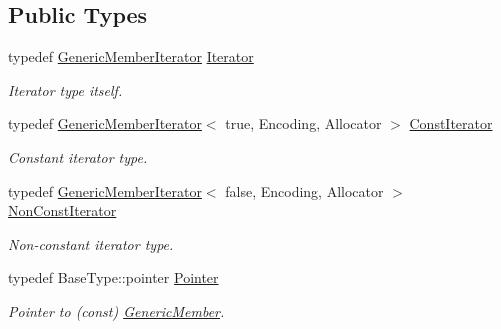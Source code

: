 \subsection*{Public Types}
\begin{DoxyCompactItemize}
\item 
\mbox{\label{class_generic_member_iterator_ad1cf1ecf6210b47906c9f179c893a8b8}} 
typedef \hyperlink{class_generic_member_iterator}{Generic\+Member\+Iterator} \hyperlink{class_generic_member_iterator_ad1cf1ecf6210b47906c9f179c893a8b8}{Iterator}
\begin{DoxyCompactList}\small\item\em Iterator type itself. \end{DoxyCompactList}\item 
\mbox{\label{class_generic_member_iterator_ae5be27a73dce0be58ee2776db896d591}} 
typedef \hyperlink{class_generic_member_iterator}{Generic\+Member\+Iterator}$<$ true, Encoding, Allocator $>$ \hyperlink{class_generic_member_iterator_ae5be27a73dce0be58ee2776db896d591}{Const\+Iterator}
\begin{DoxyCompactList}\small\item\em Constant iterator type. \end{DoxyCompactList}\item 
\mbox{\label{class_generic_member_iterator_abc26eb06f2962765b11dcd06ce84ac02}} 
typedef \hyperlink{class_generic_member_iterator}{Generic\+Member\+Iterator}$<$ false, Encoding, Allocator $>$ \hyperlink{class_generic_member_iterator_abc26eb06f2962765b11dcd06ce84ac02}{Non\+Const\+Iterator}
\begin{DoxyCompactList}\small\item\em Non-\/constant iterator type. \end{DoxyCompactList}\item 
\mbox{\label{class_generic_member_iterator_ac69f141f1fde31c1f550f524a69c5de9}} 
typedef Base\+Type\+::pointer \hyperlink{class_generic_member_iterator_ac69f141f1fde31c1f550f524a69c5de9}{Pointer}
\begin{DoxyCompactList}\small\item\em Pointer to (const) \hyperlink{struct_generic_member}{Generic\+Member}. \end{DoxyCompactList}\item 

\end{DoxyCompactItemize}
